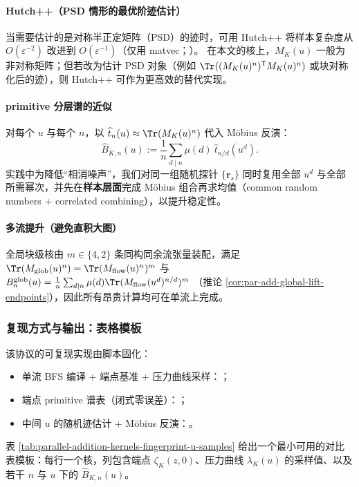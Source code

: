 \paragraph{Hutch++（PSD 情形的最优阶迹估计）}
当需要估计的是对称半正定矩阵（PSD）的迹时，可用 Hutch++ 将样本复杂度从 $O(\varepsilon^{-2})$ 改进到 $O(\varepsilon^{-1})$（仅用 matvec；\cite{MeyerMuscoMuscoWoodruff2021Hutchpp}）。
在本文的核上，$M_K(u)$ 一般为非对称矩阵；但若改为估计 PSD 对象（例如 $\Tr((M_K(u)^n)^{\mathsf T}M_K(u)^n)$ 或块对称化后的迹），则 Hutch++ 可作为更高效的替代实现。

\paragraph{primitive 分层谱的近似}
对每个 $u$ 与每个 $n$，以 $\widehat t_n(u)\approx \Tr(M_K(u)^n)$ 代入 Möbius 反演：
\[
\widehat B_{K,n}(u):=\frac{1}{n}\sum_{d\mid n}\mu(d)\ \widehat t_{n/d}(u^d).
\]
实践中为降低“相消噪声”，我们对同一组随机探针 $\{\mathbf r_s\}$ 同时复用全部 $u^d$ 与全部所需幂次，并先在\textbf{样本层面}完成 Möbius 组合再求均值（common random numbers + correlated combining），以提升稳定性。

\paragraph{多流提升（避免直积大图）}
全局块级核由 $m\in\{4,2\}$ 条同构同余流张量装配，满足
\(
\Tr(M_{\mathrm{glob}}(u)^n)=\Tr(M_{\mathrm{flow}}(u)^n)^m
\)
与
\(
B_n^{\mathrm{glob}}(u)=\frac1n\sum_{d\mid n}\mu(d)\Tr(M_{\mathrm{flow}}(u^d)^{n/d})^m
\)
（推论 \ref{cor:par-add-global-lift-endpoints}），因此所有昂贵计算均可在单流上完成。

\subsubsection{复现方式与输出：表格模板}
该协议的可复现实现由脚本固化：
\begin{itemize}
  \item 单流 BFS 编译 + 端点基准 + 压力曲线采样：；
  \item 端点 primitive 谱表（闭式零误差）：；
  \item 中间 $u$ 的随机迹估计 + Möbius 反演：。
\end{itemize}
表 \ref{tab:parallel-addition-kernels-fingerprint-u-samples} 给出一个最小可用的对比表模板：每行一个核，列包含端点 $\zeta_K(z,0)$、压力曲线 $\lambda_K(u)$ 的采样值、以及若干 $n$ 与 $u$ 下的 $\widehat B_{K,n}(u)$。

